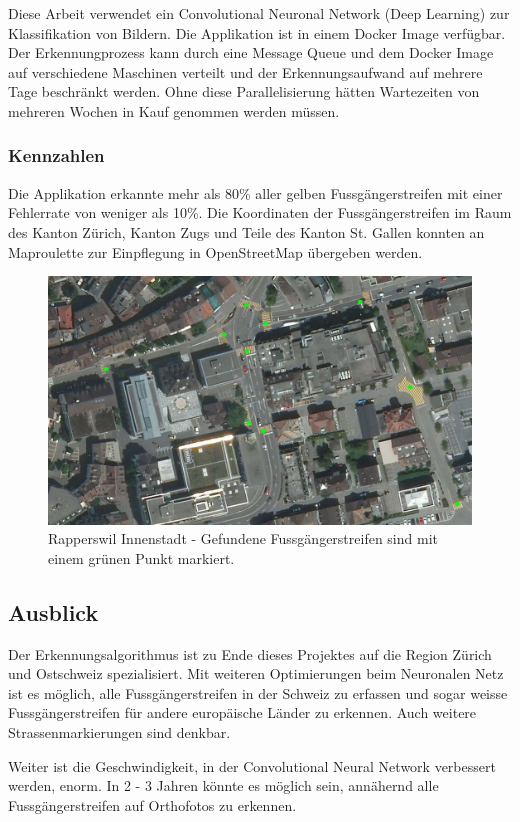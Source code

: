 Diese Arbeit verwendet ein Convolutional Neuronal Network (Deep Learning) zur Klassifikation von Bildern. Die Applikation ist in einem Docker Image verfügbar. Der Erkennungprozess kann durch eine Message Queue und dem Docker Image auf verschiedene Maschinen verteilt und der Erkennungsaufwand auf mehrere Tage beschränkt werden. Ohne diese Parallelisierung hätten Wartezeiten von mehreren Wochen in Kauf genommen werden müssen.

\subsubsection{Kennzahlen}
Die Applikation erkannte mehr als 80\% aller gelben Fussgängerstreifen mit einer Fehlerrate von weniger als 10\%. Die Koordinaten der Fussgängerstreifen im Raum des Kanton Zürich, Kanton Zugs und Teile des Kanton St. Gallen konnten an Maproulette zur Einpflegung in OpenStreetMap übergeben werden.
\\
\begin{figure}[H]
	\centering
	\includegraphics[width=\textwidth -10mm]{images/boxsave_rappi.png}
	\caption[Überblick]{Rapperswil Innenstadt - Gefundene Fussgängerstreifen sind mit einem grünen Punkt markiert.}
\end{figure}

\subsection*{Ausblick}
Der Erkennungsalgorithmus ist zu Ende dieses Projektes auf die Region Zürich und Ostschweiz spezialisiert. Mit weiteren Optimierungen beim Neuronalen Netz ist es möglich, alle Fussgängerstreifen in der Schweiz zu erfassen und sogar weisse Fussgängerstreifen für andere europäische Länder zu erkennen. Auch weitere Strassenmarkierungen sind denkbar.

Weiter ist die Geschwindigkeit, in der Convolutional Neural Network verbessert werden, enorm. In 2 - 3 Jahren könnte es möglich sein, annähernd alle Fussgängerstreifen auf Orthofotos zu erkennen.
\newpage